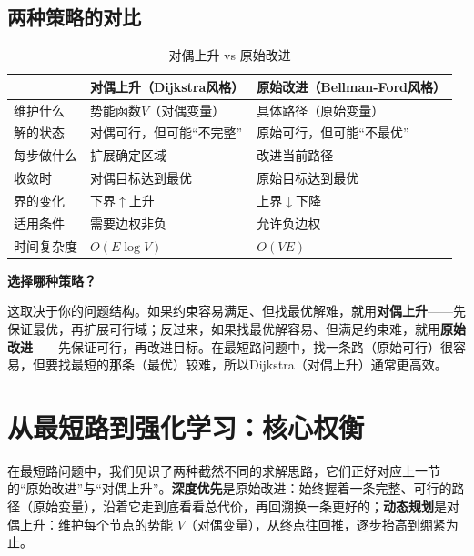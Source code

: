 \subsection{两种策略的对比}

\begin{table}[htbp]
\centering
\caption{对偶上升 vs 原始改进}
\small
\begin{tabularx}{\textwidth}{lXX}
\toprule
& \textbf{对偶上升（Dijkstra风格）} & \textbf{原始改进（Bellman-Ford风格）} \\
\midrule
维护什么 & 势能函数$V$（对偶变量） & 具体路径（原始变量） \\
解的状态 & 对偶可行，但可能“不完整” & 原始可行，但可能“不最优” \\
每步做什么 & 扩展确定区域 & 改进当前路径 \\
收敛时 & 对偶目标达到最优 & 原始目标达到最优 \\
界的变化 & 下界$\uparrow$上升 & 上界$\downarrow$下降 \\
\midrule
适用条件 & 需要边权非负 & 允许负边权 \\
时间复杂度 & $O(E \log V)$ & $O(VE)$ \\
\bottomrule
\end{tabularx}
\end{table}

\begin{physicalmeaning}
\textbf{选择哪种策略？}

这取决于你的问题结构。如果约束容易满足、但找最优解难，就用\textbf{对偶上升}——先保证最优，再扩展可行域；反过来，如果找最优解容易、但满足约束难，就用\textbf{原始改进}——先保证可行，再改进目标。在最短路问题中，找一条路（原始可行）很容易，但要找最短的那条（最优）较难，所以Dijkstra（对偶上升）通常更高效。
\end{physicalmeaning}

\section{从最短路到强化学习：核心权衡}

在最短路问题中，我们见识了两种截然不同的求解思路，它们正好对应上一节的“原始改进”与“对偶上升”。\textbf{深度优先}是原始改进：始终握着一条完整、可行的路径（原始变量），沿着它走到底看看总代价，再回溯换一条更好的；\textbf{动态规划}是对偶上升：维护每个节点的势能 $V$（对偶变量），从终点往回推，逐步抬高到绷紧为止。

